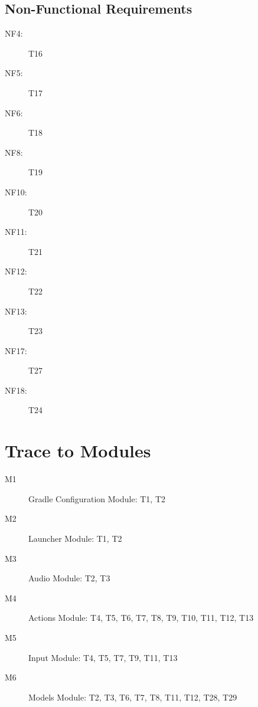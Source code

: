 \documentclass[12pt, titlepage]{article}
\begin{document}
\subsection{Non-Functional Requirements}

\begin{description}

    \item[NF4:] T16

    \item[NF5:] T17

    \item[NF6:] T18

    \item[NF8:] T19

    \item[NF10:] T20

    \item[NF11:] T21

    \item[NF12:] T22

    \item[NF13:] T23

    \item[NF17:] T27

    \item[NF18:] T24

\end{description}

\section{Trace to Modules}

\begin{description}
    \item[M1] Gradle Configuration Module:
    T1, T2

    \item[M2] Launcher Module:
    T1, T2

    \item[M3] Audio Module:
    T2, T3

    \item[M4] Actions Module:
    T4, T5, T6, T7, T8, T9, T10, T11, T12, T13

    \item[M5] Input Module:
    T4, T5, T7, T9, T11, T13

    \item[M6] Models Module:
    T2, T3, T6, T7, T8, T11, T12, T28, T29

\end{description}
\end{document}
